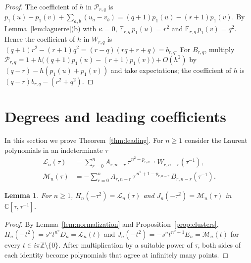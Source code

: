 \documentclass[11pt]{amsart}
\newtheorem{lemma}[theorem]{Lemma}
\theoremstyle{remark}
\numberwithin{equation}{section}
\newcommand{\Z}{\mathbb{Z}}
\newcommand{\C}{\mathbb{C}}
\newcommand{\E}{\mathbb{E}}
\begin{document}
\begin{proof}
The coefficient of $h$ in $\mathcal P_{r,q}$ is $p_1(u)-p_1(v)+\sum_{a,b}(u_a-v_b)=(q+1)p_1(u)-(r+1)p_1(v)$. By Lemma~\ref{lem:laguerre}(b) with $\kappa=0$, $\E_{r,q}\,p_1(u)=r^2$ and $\E_{r,q}\,p_1(v)=q^2$. Hence the coefficient of $h$ in $W_{r,q}$ is $(q+1)r^2-(r+1)q^2=(r-q)(rq+r+q)=b_{r,q}$. For $B_{r,q}$, multiply $\mathcal P_{r,q}=1+h\bigl((q+1)p_1(u)-(r+1)p_1(v)\bigr)+O(h^2)$ by $(q-r)-h(p_1(u)+p_1(v))$ and take expectations; the coefficient of $h$ is $(q-r)b_{r,q}-(r^2+q^2)$.
\end{proof}

\section{Degrees and leading coefficients}\label{sec:leading}

In this section we prove Theorem~\ref{thm:leading}. For $n\ge1$ consider the Laurent polynomials in an indeterminate $\tau$
\begin{align*}
\mathcal L_n(\tau)&=\sum_{r=0}^nA_{r,n-r}\,\tau^{\,n^2-p_{r,n-r}}\,W_{r,n-r}(\tau^{-1}),\\
\mathcal M_n(\tau)&=-\sum_{r=0}^nA_{r,n-r}\,\tau^{\,n^2+1-p_{r,n-r}}\,B_{r,n-r}(\tau^{-1}).
\end{align*}

\begin{lemma}\label{lem:laurent}
For $n\ge1$, $H_n(-\tau^2)=\mathcal L_n(\tau)$ and $J_n(-\tau^2)=\mathcal M_n(\tau)$ in $\C[\tau,\tau^{-1}]$.
\end{lemma}

\begin{proof}
By Lemma~\ref{lem:normalization} and Proposition~\ref{prop:clusters}, $H_n(-t^2)=s^nt^{n^2}D_n=\mathcal L_n(t)$ and $J_n(-t^2)=-s^nt^{n^2+1}E_n=\mathcal M_n(t)$ for every $t\in i\pi\Z\setminus\{0\}$. After multiplication by a suitable power of $\tau$, both sides of each identity become polynomials that agree at infinitely many points.
\end{proof}
\end{document}
